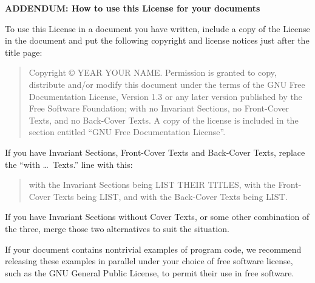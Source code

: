 \documentclass[10pt,a4paper,ngerman,titlepage,tocindentauto]{article}
\begin{document}
\begin{multicols}{3}
{					\begin{center}
					{\bf ADDENDUM: How to use this License for your documents\par}
					\end{center}

					To use this License in a document you have written, include a copy of
					the License in the document and put the following copyright and
					license notices just after the title page:

					\bigskip
					\begin{quote}
						 Copyright \copyright{}  YEAR  YOUR NAME.
						 Permission is granted to copy, distribute and/or modify this document
						 under the terms of the GNU Free Documentation License, Version 1.3
						 or any later version published by the Free Software Foundation;
						 with no Invariant Sections, no Front-Cover Texts, and no Back-Cover Texts.
						 A copy of the license is included in the section entitled ``GNU
						 Free Documentation License''.
					\end{quote}
					\bigskip
						 
					If you have Invariant Sections, Front-Cover Texts and Back-Cover Texts,
					replace the ``with \dots\ Texts.'' line with this:

					\bigskip
					\begin{quote}
						 with the Invariant Sections being LIST THEIR TITLES, with the
						 Front-Cover Texts being LIST, and with the Back-Cover Texts being LIST.
					\end{quote}
					\bigskip
						 
					If you have Invariant Sections without Cover Texts, or some other
					combination of the three, merge those two alternatives to suit the
					situation.

					If your document contains nontrivial examples of program code, we
					recommend releasing these examples in parallel under your choice of
					free software license, such as the GNU General Public License,
					to permit their use in free software.
				}
			\end{multicols}
\end{document}
